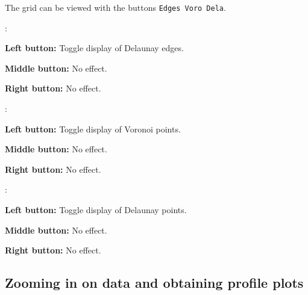 \documentclass[12pt,oneside]{article}
\begin{document}
The grid can be viewed with the buttons \verb+Edges Voro Dela+.
\begin{list}{}
\item {}:
\begin{list}{}
\item {\bf Left button:} Toggle display of Delaunay edges.
\item {\bf Middle button:} No effect.
\item {\bf Right button:} No effect.
\end{list}
\item {}:
\begin{list}{}
\item {\bf Left button:} Toggle display of Voronoi points.
\item {\bf Middle button:} No effect.
\item {\bf Right button:} No effect.
\end{list}
\item {}:
\begin{list}{}
\item {\bf Left button:} Toggle display of Delaunay points.
\item {\bf Middle button:} No effect.
\item {\bf Right button:} No effect.
\end{list}
\end{list}

\subsection{Zooming in on data and obtaining profile plots}
\end{document}
